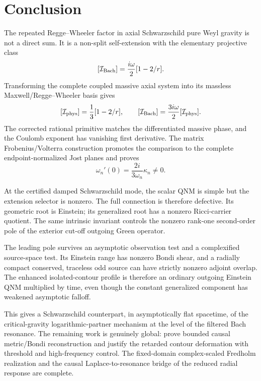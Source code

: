\documentclass[11pt]{article}
\theoremstyle{remark}
\begin{document}
\section{Conclusion}

The repeated Regge--Wheeler factor in axial Schwarzschild pure Weyl
gravity is not a direct sum.  It is a non-split self-extension with the
elementary projective class
\[
 [\mathcal I_{\rm Bach}]
 =\frac{i\omega}{2}[1-2/r].
\]
Transforming the complete coupled massive axial system into its massless
Maxwell/Regge--Wheeler basis gives
\[
 [\mathcal I_{\rm phys}]=\frac13[1-2/r],
 \qquad
 [\mathcal I_{\rm Bach}]
 =\frac{3i\omega}{2}[\mathcal I_{\rm phys}].
\]
The corrected rational primitive matches the differentiated massive
phase, and the Coulomb exponent has vanishing first derivative.  The
matrix Frobenius/Volterra construction promotes the comparison to the
complete endpoint-normalized Jost planes and proves
\[
 \omega_n'(0)=\frac{2i}{3\omega_n}\kappa_n\ne0.
\]

At the certified damped Schwarzschild mode, the scalar QNM is simple but
the extension selector is nonzero.  The full connection is therefore
defective.  Its geometric root is Einstein; its generalized root has a
nonzero Ricci-carrier quotient.  The same intrinsic invariant controls the
nonzero rank-one
second-order pole of the exterior cut-off outgoing Green operator.

The leading pole survives an asymptotic observation test and a
complexified source-space test.  Its Einstein range has nonzero Bondi
shear, and a radially compact conserved, traceless odd source can have
strictly nonzero adjoint overlap.
The enhanced isolated-contour profile is therefore an ordinary outgoing
Einstein QNM multiplied by time, even though the constant generalized
component has weakened asymptotic falloff.

This gives a Schwarzschild counterpart, in asymptotically flat spacetime,
of the critical-gravity logarithmic-partner mechanism at the level of the
filtered Bach resonance.  The remaining work is genuinely global:
prove bounded causal metric/Bondi reconstruction and justify the retarded
contour deformation with threshold and high-frequency control.  The
fixed-domain complex-scaled Fredholm realization and the causal
Laplace-to-resonance bridge of the reduced radial response are complete.
\end{document}
